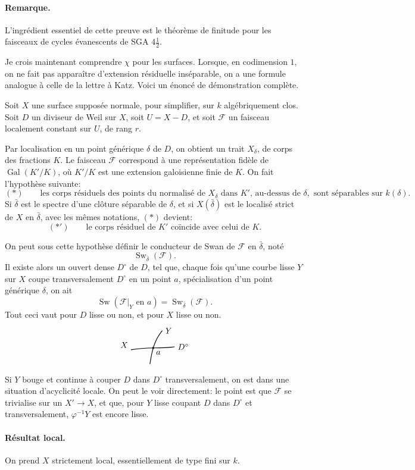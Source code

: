 \documentclass[11pt]{article}
\newcommand{\transverseCurveSketch}{%
\begin{tikzpicture}[scale=.8,baseline=-.5ex]
  \draw[thick] (-.15,0) .. controls (.7,.15) and (1.35,.05) .. (2.15,.15) node[right]{$D^\circ$};
  \draw[thick] (.85,-.75) .. controls (.95,-.1) and (1.05,.45) .. (1.5,1.0) node[right]{$Y$};
  \fill (1.02,.09) circle (1.4pt) node[below right]{$a$};
  \node[left] at (-.15,.25){$X$};
\end{tikzpicture}%
}
\newcommand{\F}{\mathcal F}
\DeclareMathOperator{\Sw}{Sw}
\begin{document}
\paragraph{Remarque.}
L'ingrédient essentiel de cette preuve est le théorème de finitude pour les faisceaux de cycles évanescents de SGA \(4\frac12\).

Je crois maintenant comprendre \(\chi\) pour les surfaces. Lorsque, en codimension \(1\), on ne fait pas apparaître d'extension résiduelle inséparable, on a une formule analogue à celle de la lettre à Katz. Voici un énoncé de démonstration complète.

Soit \(X\) une surface supposée normale, pour simplifier, sur \(k\) algébriquement clos. Soit \(D\) un diviseur de Weil sur \(X\), soit \(U=X-D\), et soit \(\F\) un faisceau localement constant sur \(U\), de rang \(r\).

Par localisation en un point générique \(\delta\) de \(D\), on obtient un trait \(X_\delta\), de corps des fractions \(K\). Le faisceau \(\F\) correspond à une représentation fidèle de \(\operatorname{Gal}(K'/K)\), où \(K'/K\) est une extension galoisienne finie de \(K\). On fait l'hypothèse suivante:
\[
(*)\qquad
\text{les corps résiduels des points du normalisé de }X_\delta
\text{ dans }K'\text{, au-dessus de }\delta,\text{ sont séparables sur }k(\delta).
\]
Si \(\bar\delta\) est le spectre d'une clôture séparable de \(\delta\), et si \(X(\bar\delta)\) est le localisé strict de \(X\) en \(\bar\delta\), avec les mêmes notations, \((*)\) devient:
\[
(*')\qquad \text{le corps résiduel de }K'\text{ coïncide avec celui de }K.
\]

On peut sous cette hypothèse définir le conducteur de Swan de \(\F\) en \(\bar\delta\), noté
\[
  \Sw_{\bar\delta}(\F).
\]
Il existe alors un ouvert dense \(D^\circ\) de \(D\), tel que, chaque fois qu'une courbe lisse \(Y\) sur \(X\) coupe transversalement \(D^\circ\) en un point \(a\), spécialisation d'un point générique \(\delta\), on ait
\[
  \Sw(\F|_Y\text{ en }a)=\Sw_{\bar\delta}(\F).
\]
Tout ceci vaut pour \(D\) lisse ou non, et pour \(X\) lisse ou non.
\[
\transverseCurveSketch
\]

Si \(Y\) bouge et continue à couper \(D\) dans \(D^\circ\) transversalement, on est dans une situation d'acyclicité locale. On peut le voir directement: le point est que \(\F\) se trivialise sur un \(X'\to X\), et que, pour \(Y\) lisse coupant \(D\) dans \(D^\circ\) et transversalement, \(\varphi^{-1}Y\) est encore lisse.

\paragraph{Résultat local.}
On prend \(X\) strictement local, essentiellement de type fini sur \(k\).
\end{document}
